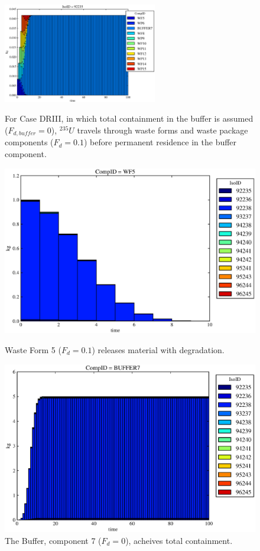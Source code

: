 \begin{figure}[ht]
\centering
\includegraphics[width=0.6\textwidth]{./chapters/demonstration/base/drIII.eps}
\caption[$^{235}U$ residence. Degradation Rate Buffer No Release.]{
For Case DRIII, in which total containment in the buffer is assumed ($F_{d,buffer}=0$), 
$^{235}U$ travels through waste forms and waste package components ($F_d = 0.1$) before 
permanent residence in the buffer component.
}
\label{fig:drIIIall}
\begin{minipage}[b]{0.45\linewidth}

  \includegraphics[width=\textwidth]{./chapters/demonstration/base/drIII1.eps}
  \caption[DRIII Waste Form Contaminants.]{
    Waste Form 5 ($F_d = 0.1$) releases material with degradation. 
    }
  \label{fig:drIIIwf5}
  
  \includegraphics[width=\textwidth]{./chapters/demonstration/base/drIII3.eps}
  \caption[Case DRIII Buffer Contaminants]{
    The Buffer, component 7 ($F_d=0$), acheives total containment.
    }
  \label{fig:drIIIbuff}


\end{minipage}
\end{figure}
